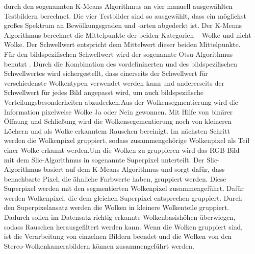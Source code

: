 \documentclass[a4paper,11pt,twoside,german]{article}
\newcommand{\absatz}{\smallbreak}
\begin{document}
durch den sogenannten K-Means Algorithmus \citep{james_13_introduction} an vier
manuell ausgewählten Testbildern berechnet. Die vier Testbilder sind so
ausgewählt, dass ein möglichst großes Spektrum an Bewölkungsgraden und -arten
abgedeckt ist. Der K-Means Algorithmus berechnet die Mittelpunkte der beiden
Kategorien – Wolke und nicht Wolke. Der Schwellwert entspricht dem Mittelwert
dieser beiden Mittelpunkte. Für den bildspezifischen Schwellwert wird der
sogenannte Otsu-Algorithmus benutzt \citep{otsu_75_threshold}. Durch die
Kombination des vordefininerten und des bildspezifischen Schwellwertes wird
sichergestellt, dass einerseits der Schwellwert für verschiedenste Wolkentypen
verwendet werden kann und andererseits der Schwellwert für jedes Bild angepasst
wird, um auch bildspezifische Verteilungsbesonderheiten abzudecken.\absatz Aus
der Wolkensegmentierung wird die Information pixelweise Wolke Ja oder Nein
gewonnen.  Mit Hilfe von binärer Öffnung und Schließung wird die
Wolkensegementierung noch von kleineren Löchern und als Wolke erkanntem Rauschen
bereinigt. Im nächsten Schritt werden die Wolkenpixel gruppiert, sodass
zusammengehörige Wolkenpixel als Teil einer Wolke erkannt werden.\absatz Um die
Wolken zu gruppieren wird das RGB-Bild mit dem Slic-Algorithmus in sogenannte
Superpixel unterteilt. Der Slic-Algorithmus basiert auf dem K-Means Algorithmus
und sorgt dafür, dass benachbarte Pixel, die ähnliche Farbwerte haben, gruppiert
werden. Diese Superpixel werden mit den segmentierten Wolkenpixel
zusammengeführt. Dafür werden Wolkenpixel, die dem gleichen Superpixel
entsprechen gruppiert. Durch den Superpixelansatz werden die Wolken in kleinere
Wolkenteile gruppiert.  Dadurch sollen im Datensatz richtig erkannte
Wolkenbasishöhen überwiegen, sodass Rauschen herausgefiltert werden kann.
\absatz Wenn die Wolken gruppiert sind, ist die Verarbeitung von einzelnen
Bildern beendet und die Wolken von den Stereo-Wolkenkamerabildern können
zusammengeführt werden.

\end{document}
